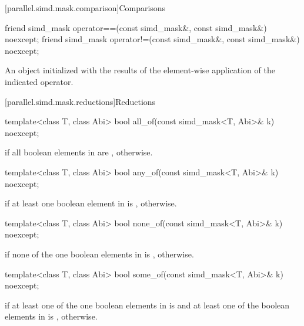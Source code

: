 [parallel.simd.mask.comparison]{Comparisons}

\begin{itemdecl}
friend simd_mask operator==(const simd_mask&, const simd_mask&) noexcept;
friend simd_mask operator!=(const simd_mask&, const simd_mask&) noexcept;
\end{itemdecl}

\begin{itemdescr}
  \pnum\returns
  An object initialized with the results of the element-wise application of the indicated operator.
\end{itemdescr}

[parallel.simd.mask.reductions]{Reductions}

\begin{itemdecl}
template<class T, class Abi> bool all_of(const simd_mask<T, Abi>& k) noexcept;
\end{itemdecl}

\begin{itemdescr}
  \pnum\returns
   if all boolean elements in  are ,  otherwise.
\end{itemdescr}

\begin{itemdecl}
template<class T, class Abi> bool any_of(const simd_mask<T, Abi>& k) noexcept;
\end{itemdecl}

\begin{itemdescr}
  \pnum\returns
   if at least one boolean element in  is ,  otherwise.
\end{itemdescr}

\begin{itemdecl}
template<class T, class Abi> bool none_of(const simd_mask<T, Abi>& k) noexcept;
\end{itemdecl}

\begin{itemdescr}
  \pnum\returns
   if none of the one boolean elements in  is ,  otherwise.
\end{itemdescr}

\begin{itemdecl}
template<class T, class Abi> bool some_of(const simd_mask<T, Abi>& k) noexcept;
\end{itemdecl}

\begin{itemdescr}
  \pnum\returns
   if at least one of the one boolean elements in  is  and at least one of the boolean elements in  is ,  otherwise.
\end{itemdescr}

